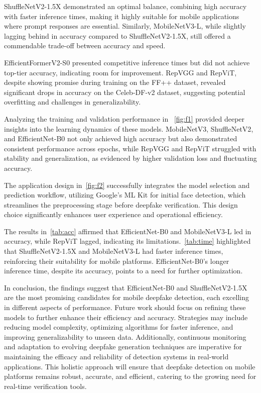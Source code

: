 \documentclass[10pt,twocolumn,letterpaper]{article}
\begin{document}
ShuffleNetV2-1.5X\cite{ma2018shufflenet} demonstrated an optimal balance, combining high accuracy with faster inference times, making it highly suitable for mobile applications where prompt responses are essential. Similarly, MobileNetV3-L, while slightly lagging behind in accuracy compared to ShuffleNetV2-1.5X\cite{ma2018shufflenet}, still offered a commendable trade-off between accuracy and speed.

EfficientFormerV2-S0\cite{li2023rethinking} presented competitive inference times but did not achieve top-tier accuracy, indicating room for improvement. RepVGG\cite{ding2021repvgg} and RepViT\cite{wang2024repvit}, despite showing promise during training on the FF++\cite{Rossler_2019_ICCV} dataset, revealed significant drops in accuracy on the Celeb-DF-v2\cite{li2020celebdf} dataset,  suggesting potential overfitting and challenges in generalizability.

Analyzing the training and validation performance in ~\cref{fig:f1} provided deeper insights into the learning dynamics of these models. MobileNetV3, ShuffleNetV2\cite{ma2018shufflenet}, and EfficientNet-B0\cite{tan2020efficientnet} not only achieved high accuracy but also demonstrated consistent performance across epochs, while RepVGG\cite{ding2021repvgg} and RepViT\cite{wang2024repvit} struggled with stability and generalization, as evidenced by higher validation loss and fluctuating accuracy.

The application design in~\cref{fig:f2} successfully integrates the model selection and prediction workflow, utilizing Google's ML Kit for initial face detection, which streamlines the preprocessing stage before deepfake verification. This design choice significantly enhances user experience and operational efficiency.

The results in~\cref{tab:acc} affirmed that EfficientNet-B0\cite{tan2020efficientnet} and MobileNetV3-L\cite{howard2019searching} led in accuracy, while RepViT\cite{wang2024repvit} lagged, indicating its limitations.~\cref{tab:time} highlighted that ShuffleNetV2-1.5X\cite{ma2018shufflenet} and MobileNetV3-L\cite{howard2019searching} had faster inference times, reinforcing their suitability for mobile platforms. EfficientNet-B0’s\cite{tan2020efficientnet} longer inference time, despite its accuracy, points to a need for further optimization.

In conclusion, the findings suggest that EfficientNet-B0\cite{tan2020efficientnet} and ShuffleNetV2-1.5X are the most promising candidates for mobile deepfake detection, each excelling in different aspects of performance. Future work should focus on refining these models to further enhance their efficiency and accuracy. Strategies may include reducing model complexity, optimizing algorithms for faster inference, and improving generalizability to unseen data. Additionally, continuous monitoring and adaptation to evolving deepfake generation techniques are imperative for maintaining the efficacy and reliability of detection systems in real-world applications. This holistic approach will ensure that deepfake detection on mobile platforms remains robust, accurate, and efficient, catering to the growing need for real-time verification tools.


{\small


}
\end{document}
